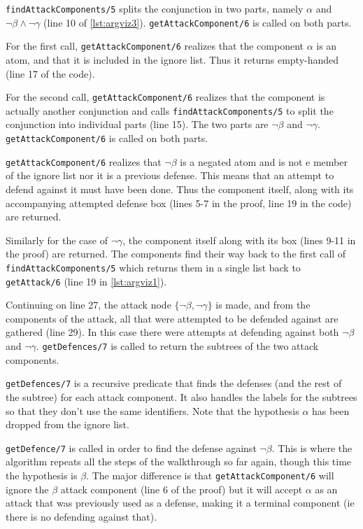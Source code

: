 \documentclass[11pt,twoside,a4paper]{report}
\begin{document}
\lstinline$findAttackComponents/5$ splits the conjunction in two parts, namely $\alpha$ and $\neg\beta\wedge\neg\gamma$ (line 10 of \autoref{lst:argviz3}). \lstinline$getAttackComponent/6$ is called on both parts.

For the first call, \lstinline$getAttackComponent/6$ realizes that the component $\alpha$ is an atom, and that it is included in the ignore list. Thus it returns empty-handed (line 17 of the code).

For the second call, \lstinline$getAttackComponent/6$ realizes that the component is actually another conjunction and calls \lstinline$findAttackComponents/5$ to split the conjunction into individual parts (line 15). The two parts are $\neg\beta$ and $\neg\gamma$. \lstinline$getAttackComponent/6$ is called on both parts.

\lstinline$getAttackComponent/6$ realizes that $\neg\beta$ is a negated atom and is not e member of the ignore list nor it is a previous defense. This means that an attempt to defend against it must have been done. Thus the component itself, along with its accompanying attempted defense box (lines 5-7 in the proof, line 19 in the code) are returned.

Similarly for the case of $\neg\gamma$, the component itself along with its box (lines 9-11 in the proof) are returned. The components find their way back to the first call of \lstinline$findAttackComponents/5$ which returns them in a single list back to \lstinline$getAttack/6$ (line 19 in \autoref{lst:argviz1}).

Continuing on line 27, the attack node $\{\neg\beta, \neg\gamma\}$ is made, and from the components of the attack, all that were attempted to be defended against are gathered (line 29). In this case there were attempts at defending against both $\neg\beta$ and $\neg\gamma$. \lstinline$getDefences/7$ is called to return the subtrees of the two attack components.

\lstinline$getDefences/7$ is a recursive predicate that finds the defenses (and the rest of the subtree) for each attack component. It also handles the labels for the subtrees so that they don't use the same identifiers. Note that the hypothesis $\alpha$ has been dropped from the ignore list.

\lstinline$getDefence/7$ is called in order to find the defense against $\neg\beta$. This is where the algorithm repeats all the steps of the walkthrough so far again, though this time the hypothesis is $\beta$. The major difference is that \lstinline$getAttackComponent/6$ will ignore the $\beta$ attack component (line 6 of the proof) but it will accept $\alpha$ as an attack that was previously used as a defense, making it a terminal component (ie there is no defending against that).
\end{document}
